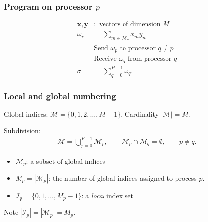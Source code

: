 \begin{frame}
\begin{center}
  \end{center}
\end{frame}

\begin{frame}
  \frametitle{Program on processor $p$}
  \begin{align*}
    \bm x, \bm y &: \text{ vectors of dimension } M \\
    \omega_p &= \sum_{m \in \mathcal{M}_p} x_m y_m \\
                 & \text{Send } \omega_p  \text{ to processor } q \not= p \\
                 & \text{Receive } \omega_q  \text{ from processor } q \\
    \sigma &= \sum_{q=0}^{P-1} \omega_q.
  \end{align*}
\end{frame}

\begin{frame}
  \frametitle{Local and global numbering}
  Global indices: $\mathcal{M} = \{0,1,2,\ldots,M-1\}$.
  Cardinality $|\mathcal{M}| = M$.

  Subdivision:
  \begin{align*}
    \mathcal{M} = \bigcup_{p=0}^{P-1} \mathcal{M}_p, \qquad
    \mathcal{M}_p \cap \mathcal{M}_q = \emptyset, \qquad
    p \not= q.
  \end{align*}

  \begin{itemize}
  \item $\mathcal{M}_p$: a subset of global indices
  \item $M_p = |\mathcal{M}_p|$: the number of global indices assigned to
    process $p$.
  \item $\mathcal{I}_p = \{0,1,\ldots,M_p-1\}$: a \emph{local} index set
  \end{itemize}

  Note $|\mathcal{I}_p| = |\mathcal{M}_p| = M_p$.
\end{frame}

